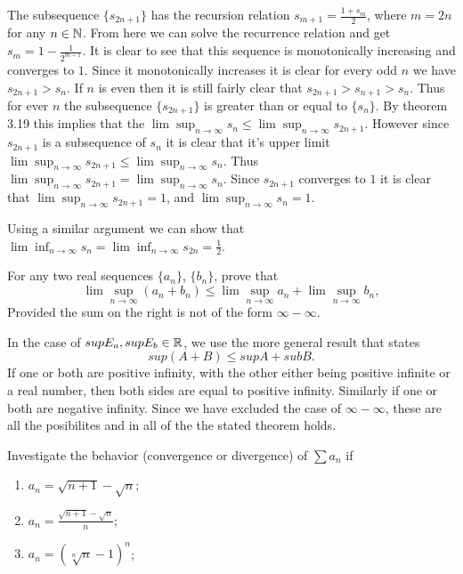 \begin{solution}
  The subsequence $\{s_{2n + 1}\}$ has the recursion relation $s_{m + 1} = \frac{1 + s_m}{2}$, where $m = 2n$ for any $n \in \mathbb{N}$.
  From here we can solve the recurrence relation and get $s_{m} = 1 - \frac{1}{2^{m - 1}}$.
  It is clear to see that this sequence is monotonically increasing and converges to $1$.
  Since it monotonically increases it is clear for every odd $n$ we have $s_{2n + 1} > s_n$.
  If $n$ is even then it is still fairly clear that $s_{2n + 1} > s_{n + 1} > s_{n}$.
  Thus for ever $n$ the subsequence $\{s_{2n + 1}\}$ is greater than or equal to $\{s_n\}$.
  By theorem 3.19 this implies that the $\lim\sup_{n \to \infty} s_n \le \lim\sup_{n \to \infty} s_{2n + 1}$.
  However since $s_{2n + 1}$ is a subsequence of $s_n$ it is clear that it's upper limit $\lim\sup_{n \to \infty} s_{2n + 1} \le \lim\sup_{n \to \infty} s_{n}$.
  Thus $\lim\sup_{n \to \infty} s_{2n + 1} = \lim\sup_{n \to \infty} s_{n}$.
  Since $s_{2n + 1}$ converges to $1$ it is clear that $\lim\sup_{n \to \infty} s_{2n + 1} = 1$, and $\lim\sup_{n \to \infty} s_{n} = 1$.

  Using a similar argument we can show that $\lim\inf_{n \to \infty} s_{n} = \lim\inf_{n \to \infty} s_{2n} = \frac{1}{2}$.
\end{solution}

\begin{problem}
  For any two real sequences $\{a_n\}$, $\{b_n\}$, prove that
  \[\lim\sup_{n \to \infty} (a_n + b_n) \le \lim\sup_{n \to \infty} a_n + \lim\sup_{n \to \infty} b_n,\]
  Provided the sum on the right is not of the form $\infty - \infty$.
\end{problem}

\begin{solution}
  In the case of $sup E_a, sup E_b \in \mathbb{R}$, we use the more general result that states
  \[sup(A + B) \le sup A + sub B.\]
  If one or both are positive infinity, with the other either being positive infinite or a real number, then both sides are equal to positive infinity.
  Similarly if one or both are negative infinity.
  Since we have excluded the case of $\infty - \infty$, these are all the posibilites and in all of the the stated theorem holds.
\end{solution}

\begin{problem}
  Investigate the behavior (convergence or divergence) of $\sum a_n$ if
  \begin{enumerate}[label=(\alph*)]
    \item $a_n = \sqrt{n + 1} - \sqrt{n}$;
    \item $a_n = \frac{\sqrt{n + 1} - \sqrt{n}}{n}$;
    \item $a_n = (\sqrt[n]{n} - 1)^n$;
  \end{enumerate}
\end{problem}

